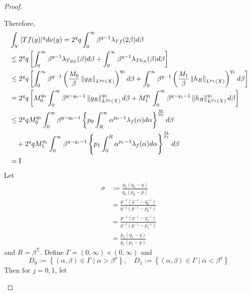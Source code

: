 \begin{proof}
\begin{enumerate}[label=(\Roman*)]
\begin{equation*}
		\end{equation*}
		Therefore,
		\begin{equation*}
			\begin{aligned}
				& \int_Y|T f(y)|^q d \nu(y)=2^q q \int_0^{\infty} \beta^{q-1} \lambda_{T f}(2 \beta) d \beta \\
				& \leq 2^q q\left[\int_0^{\infty} \beta^{q-1} \lambda_{T g_R}(\beta) d \beta+\int_0^{\infty} \beta^{q-1} \lambda_{T h_R}(\beta) d \beta\right] \\
				& \leq 2^q q\left[\int_0^{\infty} \beta^{q-1}\left(\frac{M_0}{\beta}\left\|g_R\right\|_{L^{p_0}(X)}\right)^{q_0} d \beta+\int_0^{\infty} \beta^{q-1}\left(\frac{M_1}{\beta}\left\|h_R\right\|_{L^{p_1}(X)}\right)^{q_1} d \beta\right] \\
				& =2^q q\left[M_0^{q_0} \int_0^{\infty} \beta^{q-q_0-1}\left\|g_R\right\|_{L^{p_0}(X)}^{q_0} d \beta+M_1^{q_1} \int_0^{\infty} \beta^{q-q_1-1}\left\|h_R\right\|_{L^{p_1}(X)}^{q_1} d \beta\right] \\
				&\leq  2^q q M_0^{q_0} \int_0^{\infty} \beta^{q-q_0-1}\left\{p_0 \int_R^{\infty} \alpha^{p_0-1} \lambda_f(\alpha) d \alpha\right\}^{\frac{q_0}{p_0}} d \beta \\
				& \quad+2^q q M_1^{q_1} \int_0^{\infty} \beta^{q-q_1-1}\left\{p_1 \int_0^R \alpha^{p_1-1} \lambda_f(\alpha) d \alpha\right\}^{\frac{q_1}{p_1}} d \beta \\
				&= \text{\RNum{1}}
			\end{aligned}
		\end{equation*}
		Let
		\begin{equation*}
			\begin{aligned}
				\sigma&:=\frac{p_0\left(q_0-q\right)}{q_0\left(p_0-p\right)}\\
				&=\frac{p^{-1}\left(q^{-1}-q_0^{-1}\right)}{q^{-1}\left(p^{-1}-p_0^{-1}\right)} \\
				&= \frac{p^{-1}\left(q^{-1}-q_1^{-1}\right)}{q^{-1}\left(p^{-1}-p_1^{-1}\right)}\\
				&=\frac{p_1\left(q_1-q\right)}{q_1\left(p_1-p\right)}
			\end{aligned}
		\end{equation*}
		and $R = \beta^\Sigma$. Define $\Gamma = (0, \infty) \times (0,\infty)$ and
		\begin{equation*}
			D_0:=\left\{(\alpha, \beta) \in \Gamma \mid \alpha>\beta^\sigma\right\}, \quad D_1:=\left\{(\alpha, \beta) \in \Gamma \mid \alpha<\beta^\sigma\right\}
		\end{equation*}
		Then for $j = 0,1$, let

\end{enumerate}
\end{proof}
